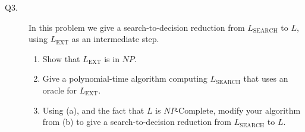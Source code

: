 \documentclass{csc_assignment}
\begin{document}
\begin{description}
\newpage
\item[Q3.]

In this problem we give a search-to-decision reduction from $L_{\text{SEARCH}}$ to $L$, using $L_{\text{EXT}}$ as an intermediate step.

  \begin{enumerate}
  \item Show that $L_{\text{EXT}}$ is in $NP$.
  \item Give a polynomial-time algorithm computing $L_{\text{SEARCH}}$ that uses an oracle for $L_{\text{EXT}}$.
  \item Using (a), and the fact that $L$ is $NP$-Complete, modify your algorithm from (b) to give a search-to-decision reduction from $L_{\text{SEARCH}}$ to $L$.
  \end{enumerate}
  

\end{description}
\end{document}
